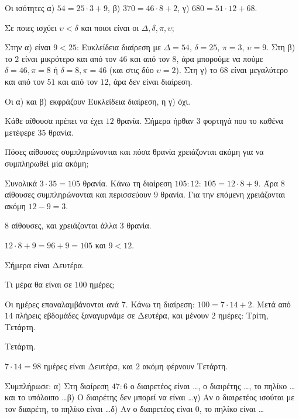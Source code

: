 
\tixero Οι ισότητες α) $54=25\cdot 3+9$, β) $370=46\cdot 8+2$, γ) $680=51\cdot 12+68$.\par
\tithelo Σε ποιες ισχύει $\upsilon<\delta$ και ποιοι είναι οι $\Delta,\delta,\pi,\upsilon$;\par
\possindeo Στην α) είναι $9<25$: Ευκλείδεια διαίρεση με $\Delta=54$, $\delta=25$, $\pi=3$, $\upsilon=9$. Στη β) το $2$ είναι μικρότερο και από τον $46$ και από τον $8$, άρα μπορούμε να πούμε $\delta=46,\pi=8$ ή $\delta=8,\pi=46$ (και στις δύο $\upsilon=2$). Στη γ) το $68$ είναι μεγαλύτερο και από τον $51$ και από τον $12$, άρα δεν είναι διαίρεση.\par
\apantisi Οι α) και β) εκφράζουν Ευκλείδεια διαίρεση, η γ) όχι.

\tixero Κάθε αίθουσα πρέπει να έχει $12$ θρανία. Σήμερα ήρθαν $3$ φορτηγά που το καθένα μετέφερε $35$ θρανία.\par
\tithelo Πόσες αίθουσες συμπληρώνονται και πόσα θρανία χρειάζονται ακόμη για να συμπληρωθεί μία ακόμη;\par
\possindeo Συνολικά $3\cdot 35=105$ θρανία. Κάνω τη διαίρεση $105:12$: $105=12\cdot 8+9$. Άρα $8$ αίθουσες συμπληρώνονται και περισσεύουν $9$ θρανία. Για την επόμενη χρειάζονται ακόμη $12-9=3$.\par
\apantisi $8$ αίθουσες, και χρειάζονται άλλα $3$ θρανία.\par
\elegxos $12\cdot 8+9=96+9=105$ και $9<12$.

\tixero Σήμερα είναι Δευτέρα.\par
\tithelo Τι μέρα θα είναι σε $100$ ημέρες;\par
\possindeo Οι ημέρες επαναλαμβάνονται ανά $7$. Κάνω τη διαίρεση: $100=7\cdot 14+2$. Μετά από $14$ πλήρεις εβδομάδες ξαναγυρνάμε σε Δευτέρα, και μένουν $2$ ημέρες: Τρίτη, Τετάρτη.\par
\apantisi Τετάρτη.\par
\elegxos $7\cdot 14=98$ ημέρες είναι Δευτέρα, και $2$ ακόμη φέρνουν Τετάρτη.



\ex Συμπλήρωσε: α) Στη διαίρεση $47:6$ ο διαιρετέος είναι \dots, ο διαιρέτης \dots, το πηλίκο \dots και το υπόλοιπο \dots β) Ο διαιρέτης δεν μπορεί να είναι \dots γ) Αν ο διαιρετέος ισούται με τον διαιρέτη, το πηλίκο είναι \dots δ) Αν ο διαιρετέος είναι $0$, το πηλίκο είναι \dots

